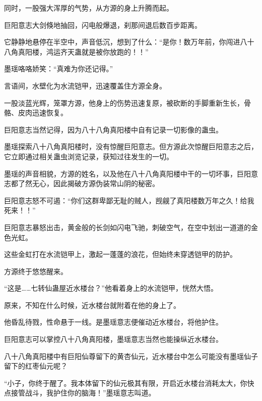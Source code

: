 \begin{this_body}
同时，一股强大浑厚的气势，从方源的身上升腾而起。

巨阳意志大剑倏地抽回，闪电般爆退，刹那间退后数百步距离。

它静静地悬停在半空中，声音低沉，想到了什么：“是你！数万年前，你闯进八十八角真阳楼，鸿运齐天蛊就是被你放跑的！！”

墨瑶咯咯娇笑：“真难为你还记得。”

言语间，水壁化为水流铠甲，迅速覆盖住方源全身。

一股淡蓝光辉，笼罩方源，他身上的伤势迅速复原，被砍断的手脚重新生长，骨骼、皮肉迅速恢复。

巨阳意志当然记得，因为八十八角真阳楼中自有记录一切影像的蛊虫。

墨瑶探索八十八角真阳楼时，没有惊醒巨阳意志。但方源此次惊醒巨阳意志之后，它立即通过相关蛊虫浏览记录，获知过往发生的一切。

墨瑶的声音相貌，方源的姓名，以及他在八十八角真阳楼中干的一切坏事，巨阳意志都了然无心，因此揭破方源伪装常山阴的秘密。

巨阳意志怒不可遏：“你们这群卑鄙无耻的贼人，觊觎了真阳楼数万年之久！给我死来！！”

巨阳意志暴怒出击，黄金般的长剑如闪电飞驰，刺破空气，在空中划出一道道的金色光虹。

这些金虹打在水流铠甲上，激起一蓬蓬的浪花，但始终未穿透铠甲的防护。

方源终于悠悠醒来。

“这是……七转仙蛊屋近水楼台？”他看着身上的水流铠甲，恍然大悟。

原来，不知在什么时候，近水楼台就附着在他的身上了。

他昏乱待戮，性命悬于一线。是墨瑶意志便催动近水楼台，将他护住。

巨阳意志可以掌控八十八角真阳楼，墨瑶意志当然也能操纵近水楼台。

八十八角真阳楼中有巨阳仙尊留下的黄杏仙元，近水楼台中怎么可能没有墨瑶仙子留下的红枣仙元呢？

“小子，你终于醒了。我本体留下的仙元极其有限，开启近水楼台消耗太大，你快点接管战斗，我护住你的脑海！”墨瑶意志叫道。

\end{this_body}

